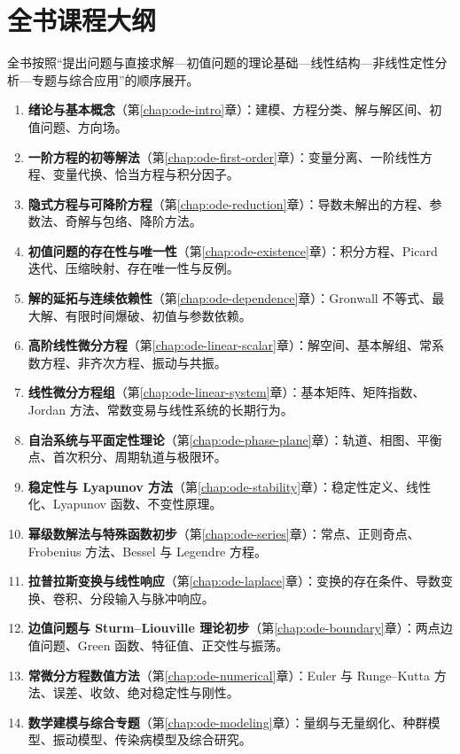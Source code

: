\documentclass[UTF8,12pt,a4paper,fontset=fandol]{ctexbook}
\begin{document}
\section*{全书课程大纲}
全书按照“提出问题与直接求解---初值问题的理论基础---线性结构---非线性定性分析---专题与综合应用”的顺序展开。
\begin{enumerate}
  \item \textbf{绪论与基本概念}（第\ref{chap:ode-intro}章）：建模、方程分类、解与解区间、初值问题、方向场。
  \item \textbf{一阶方程的初等解法}（第\ref{chap:ode-first-order}章）：变量分离、一阶线性方程、变量代换、恰当方程与积分因子。
  \item \textbf{隐式方程与可降阶方程}（第\ref{chap:ode-reduction}章）：导数未解出的方程、参数法、奇解与包络、降阶方法。
  \item \textbf{初值问题的存在性与唯一性}（第\ref{chap:ode-existence}章）：积分方程、Picard 迭代、压缩映射、存在唯一性与反例。
  \item \textbf{解的延拓与连续依赖性}（第\ref{chap:ode-dependence}章）：Gronwall 不等式、最大解、有限时间爆破、初值与参数依赖。
  \item \textbf{高阶线性微分方程}（第\ref{chap:ode-linear-scalar}章）：解空间、基本解组、常系数方程、非齐次方程、振动与共振。
  \item \textbf{线性微分方程组}（第\ref{chap:ode-linear-system}章）：基本矩阵、矩阵指数、Jordan 方法、常数变易与线性系统的长期行为。
  \item \textbf{自治系统与平面定性理论}（第\ref{chap:ode-phase-plane}章）：轨道、相图、平衡点、首次积分、周期轨道与极限环。
  \item \textbf{稳定性与 Lyapunov 方法}（第\ref{chap:ode-stability}章）：稳定性定义、线性化、Lyapunov 函数、不变性原理。
  \item \textbf{幂级数解法与特殊函数初步}（第\ref{chap:ode-series}章）：常点、正则奇点、Frobenius 方法、Bessel 与 Legendre 方程。
  \item \textbf{拉普拉斯变换与线性响应}（第\ref{chap:ode-laplace}章）：变换的存在条件、导数变换、卷积、分段输入与脉冲响应。
  \item \textbf{边值问题与 Sturm--Liouville 理论初步}（第\ref{chap:ode-boundary}章）：两点边值问题、Green 函数、特征值、正交性与振荡。
  \item \textbf{常微分方程数值方法}（第\ref{chap:ode-numerical}章）：Euler 与 Runge--Kutta 方法、误差、收敛、绝对稳定性与刚性。
  \item \textbf{数学建模与综合专题}（第\ref{chap:ode-modeling}章）：量纲与无量纲化、种群模型、振动模型、传染病模型及综合研究。
\end{enumerate}
\end{document}
